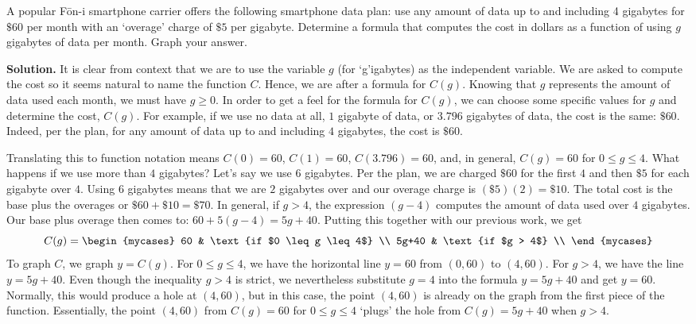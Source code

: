 \documentclass{ximera}
\begin{document}
\begin{example}  \label{dataplanex} A popular F\={o}n-i smartphone carrier offers the following smartphone data plan: use any amount of data up to and including 4 gigabytes for $\$ 60$ per month with an `overage' charge of $ \$5$ per gigabyte.  Determine a formula that computes the cost in dollars as a function of using $g$ gigabytes of data per month. Graph your answer.



{\bf Solution.}  It is clear from context that we are to use the variable $g$ (for `g'igabytes) as the independent variable.  We are asked to compute the cost so it seems natural to name the function $C$.  Hence, we are after a formula for $C(g)$.  Knowing that $g$ represents the amount of data used each month, we must have $g \geq 0$.  In order to get a feel for the formula for $C(g)$, we can choose some specific values for $g$ and determine the cost, $C(g)$.  For example, if we use no data at all, $1$ gigabyte of data,  or $3.796$ gigabytes of data, the cost is the same:  $\$60$.  Indeed, per the plan, for any amount of data up to and including $4$ gigabytes, the cost is $\$60$.  



Translating this to function notation means $C(0) = 60$, $C(1) = 60$, $C(3.796) = 60$, and, in general, $C(g) = 60$ for  $0 \leq g \leq 4$.  What happens if we use more than $4$ gigabytes?  Let's say we use $6$ gigabytes.  Per the plan, we are charged $\$60$ for the first $4$ and then $\$5$ for each gigabyte over $4$.  Using $6$ gigabytes means that we are $2$ gigabytes over and our overage charge is $ (\$ 5)(2) = \$ 10$.  The total cost is the base plus the overages or $\$60 + \$10 = \$70$.  In general, if $g>4$, the expression $(g-4)$ computes the amount of data used over $4$ gigabytes.  Our base plus overage then comes to: $60 + 5(g-4) = 5g+40$.  Putting this together with our previous work, we get \[ C(g)  = \begin{mycases} 
      60 &  \text{if $0 \leq g \leq 4$} \\
      5g+40   & \text{if $g > 4$} \\
   \end{mycases}
\] To graph $C$, we graph $y = C(g)$.  For $0 \leq g \leq 4$, we have the horizontal line $y = 60$ from $(0,60)$ to $(4,60)$.  For $g>4$, we have the line $y = 5g+ 40$.  Even though the inequality $g > 4$ is strict, we nevertheless substitute $g = 4$ into the formula $y = 5g + 40$ and get $y = 60$.  Normally, this would produce a hole at $(4, 60)$, but in this case, the point $(4, 60)$ is already on the graph from the first piece of the function.  Essentially, the point $(4,60)$ from $C(g) = 60$ for $0 \leq g \leq 4$ `plugs' the hole from $C(g) = 5g + 40$ when $g> 4$.   




\end{example}
\end{document}
